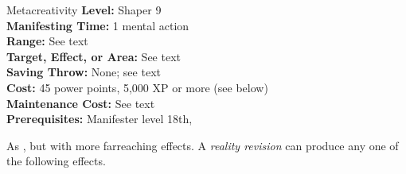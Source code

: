 {Metacreativity}
{
	\textbf{Level:}
	Shaper 9\\
	\textbf{Manifesting Time:}
	1 mental action\\
	\textbf{Range:}
	See text\\
	\textbf{Target, Effect, or Area:}
	See text\\
	\textbf{Saving Throw:}
	None; see text\\
	\textbf{Cost:}
	45 power points, 5,000 XP or more (see below)\\
	\textbf{Maintenance Cost:}
	See text\\
	\textbf{Prerequisites:}
	Manifester level 18th, \\
}
{
	As , but with more farreaching effects. A \emph{reality revision} can produce any one of the following effects.

}
